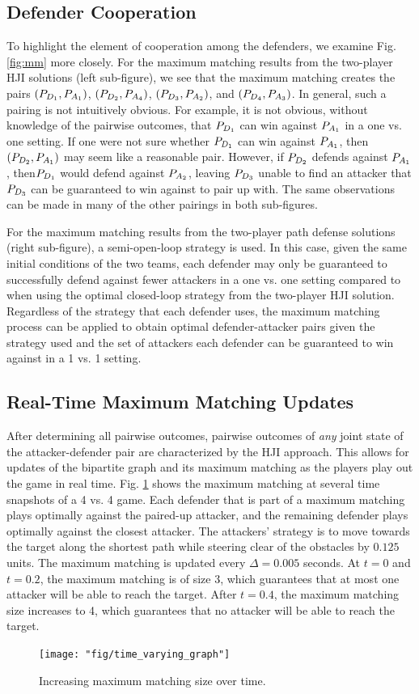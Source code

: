 \subsection{Defender Cooperation}
To highlight the element of cooperation among the defenders, we examine Fig. \ref{fig:mm} more closely. For the maximum matching results from the two-player HJI solutions (left sub-figure), we see that the maximum matching creates the pairs $(P_{D_{1}}, P_{A_{1}})$, $(P_{D_{2}}, P_{A_{4}})$, $(P_{D_{3}}, P_{A_{2}})$, and $(P_{D_{4}}, P_{A_{3}})$. In general, such a pairing is not intuitively obvious. For example, it is not obvious, without knowledge of the pairwise outcomes, that $P_{D_{1}}$ can win against $P_{A_{1}}$ in a one vs. one setting. If one were not sure whether $P_{D_{1}}$ can win against $P_{A_{1}}$, then $(P_{D_{2}}, P_{A_{1}})$ may seem like a reasonable pair. However, if $P_{D_{2}}$ defends against $P_{A_{1}}$, then$P_{D_{1}}$ would defend against $P_{A_{2}}$, leaving $P_{D_{3}}$ unable to find an attacker that $P_{D_{3}}$ can be guaranteed to win against to pair up with. The same observations can be made in many of the other pairings in both sub-figures.

For the maximum matching results from the two-player path defense solutions (right sub-figure), a semi-open-loop strategy is used. In this case, given the same initial conditions of the two teams, each defender may only be guaranteed to successfully defend against fewer attackers in a one vs. one setting compared to when using the optimal closed-loop strategy from the two-player HJI solution. Regardless of the strategy that each defender uses, the maximum matching process can be applied to obtain optimal defender-attacker pairs given the strategy used and the set of attackers each defender can be guaranteed to win against in a 1 vs. 1 setting.

\subsection{Real-Time Maximum Matching Updates}
After determining all pairwise outcomes, pairwise outcomes of \textit{any} joint state of the attacker-defender pair are characterized by the HJI approach. This allows for updates of the bipartite graph and its maximum matching as the players play out the game in real time. Fig. \ref{fig:real_time_update} shows the maximum matching at several time snapshots of a 4 vs. 4 game. Each defender that is part of a maximum matching plays optimally against the paired-up attacker, and the remaining defender plays optimally against the closest attacker. The attackers' strategy is to move towards the target along the shortest path while steering clear of the obstacles by $0.125$ units. The maximum matching is updated every $\Delta=0.005$ seconds. At $t=0$ and $t=0.2$, the maximum matching is of size 3, which guarantees that at most one attacker will be able to reach the target. After $t=0.4$, the maximum matching size increases to 4, which guarantees that no attacker will be able to reach the target.

\begin{figure}
	\centering
	\texttt{[image: "fig/time\_varying\_graph"]}
	\caption{Increasing maximum matching size over time.}
	\label{fig:real_time_update}
\end{figure}
